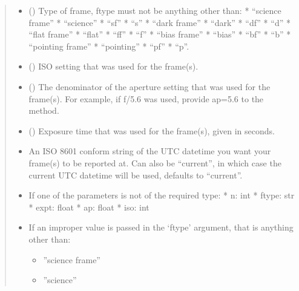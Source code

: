 \documentclass[letterpaper,10pt,english]{sphinxmanual}
\begin{document}
\begin{fulllineitems}
\begin{fulllineitems}
\begin{quote}
\begin{description}
\begin{itemize}
\item {} 
\sphinxAtStartPar
{} () \textendash{} Type of frame, ftype must not be anything other than:
* “science frame”
* “science”
* “sf”
* “s”
* “dark frame”
* “dark”
* “df”
* “d”
* “flat frame”
* “flat”
* “ff”
* “f”
* “bias frame”
* “bias”
* “bf”
* “b”
* “pointing frame”
* “pointing”
* “pf”
* “p”.

\item {} 
\sphinxAtStartPar
{} () \textendash{} ISO setting that was used for the frame(s).

\item {} 
\sphinxAtStartPar
{} () \textendash{} The denominator of the aperture setting that was used for the
frame(s). For example, if f/5.6 was used, provide ap=5.6 to the
method.

\item {} 
\sphinxAtStartPar
{} () \textendash{} Exposure time that was used for the frame(s), given in seconds.

\item {} 
\sphinxAtStartPar
{} \textendash{} An ISO 8601 conform string of the UTC datetime you want your
frame(s) to be reported at. Can also be “current”, in which case the
current UTC datetime will be used, defaults to “current”.

\end{itemize}

\begin{itemize}
\item {} 
\sphinxAtStartPar
{} \textendash{} If one of the parameters is not of the required type:
* n: int
* ftype: str
* expt: float
* ap: float
* iso: int

\item {} 
\sphinxAtStartPar
{} \textendash{} 
\sphinxAtStartPar
If an improper value is passed in the ‘ftype’ argument, that is
anything other than:
\begin{itemize}
\item {} 
\sphinxAtStartPar
”science frame”

\item {} 
\sphinxAtStartPar
”science”


\end{itemize}
\end{itemize}
\end{description}
\end{quote}
\end{fulllineitems}
\end{fulllineitems}
\end{document}
